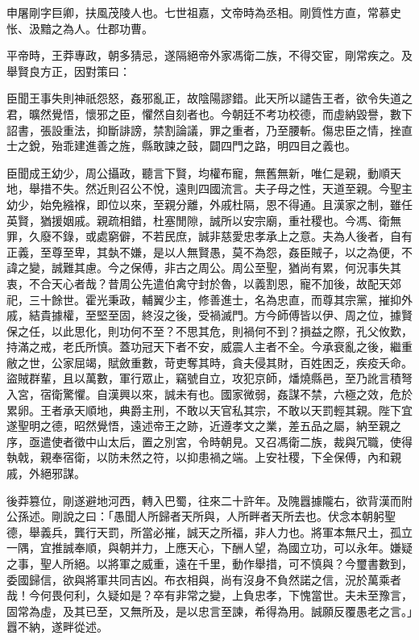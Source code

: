 
\begin{pinyinscope}
申屠剛字巨卿，扶風茂陵人也。七世祖嘉，文帝時為丞相。剛質性方直，常慕史怅、汲黯之為人。仕郡功曹。

平帝時，王莽專政，朝多猜忌，遂隔絕帝外家馮衛二族，不得交宦，剛常疾之。及舉賢良方正，因對策曰：

臣聞王事失則神祇怨怒，姦邪亂正，故陰陽謬錯。此天所以譴告王者，欲令失道之君，曠然覺悟，懷邪之臣，懼然自刻者也。今朝廷不考功校德，而虛納毀譽，數下詔書，張設重法，抑斷誹謗，禁割論議，罪之重者，乃至腰斬。傷忠臣之情，挫直士之銳，殆乖建進善之旌，縣敢諫之鼓，闢四門之路，明四目之義也。

臣聞成王幼少，周公攝政，聽言下賢，均權布寵，無舊無新，唯仁是親，動順天地，舉措不失。然近則召公不悅，遠則四國流言。夫子母之性，天道至親。今聖主幼少，始免繈褓，即位以來，至親分離，外戚杜隔，恩不得通。且漢家之制，雖任英賢，猶援姻戚。親疏相錯，杜塞閒隙，誠所以安宗廟，重社稷也。今馮、衛無罪，久廢不錄，或處窮僻，不若民庶，誠非慈愛忠孝承上之意。夫為人後者，自有正義，至尊至卑，其埶不嫌，是以人無賢愚，莫不為怨，姦臣賊子，以之為便，不諱之變，誠難其慮。今之保傅，非古之周公。周公至聖，猶尚有累，何況事失其衷，不合天心者哉？昔周公先遣伯禽守封於魯，以義割恩，寵不加後，故配天郊祀，三十餘世。霍光秉政，輔翼少主，修善進士，名為忠直，而尊其宗黨，摧抑外戚，結貴據權，至堅至固，終沒之後，受禍滅門。方今師傅皆以伊、周之位，據賢保之任，以此思化，則功何不至？不思其危，則禍何不到？損益之際，孔父攸歎，持滿之戒，老氏所慎。蓋功冠天下者不安，威震人主者不全。今承衰亂之後，繼重敝之世，公家屈竭，賦斂重數，苛吏奪其時，貪夫侵其財，百姓困乏，疾疫夭命。盜賊群輩，且以萬數，軍行眾止，竊號自立，攻犯京師，燔燒縣邑，至乃訛言積弩入宮，宿衛驚懼。自漢興以來，誠未有也。國家微弱，姦謀不禁，六極之效，危於累卵。王者承天順地，典爵主刑，不敢以天官私其宗，不敢以天罰輕其親。陛下宜遂聖明之德，昭然覺悟，遠述帝王之跡，近遵孝文之業，差五品之屬，納至親之序，亟遣使者徵中山太后，置之別宮，令時朝見。又召馮衛二族，裁與冗職，使得執戟，親奉宿衛，以防未然之符，以抑患禍之端。上安社稷，下全保傅，內和親戚，外絕邪謀。

後莽篡位，剛遂避地河西，轉入巴蜀，往來二十許年。及隗囂據隴右，欲背漢而附公孫述。剛說之曰：「愚聞人所歸者天所與，人所畔者天所去也。伏念本朝躬聖德，舉義兵，龔行天罰，所當必摧，誠天之所福，非人力也。將軍本無尺土，孤立一隅，宜推誠奉順，與朝并力，上應天心，下酬人望，為國立功，可以永年。嫌疑之事，聖人所絕。以將軍之威重，遠在千里，動作舉措，可不慎與？今璽書數到，委國歸信，欲與將軍共同吉凶。布衣相與，尚有沒身不負然諾之信，況於萬乘者哉！今何畏何利，久疑如是？卒有非常之變，上負忠孝，下愧當世。夫未至豫言，固常為虛，及其已至，又無所及，是以忠言至諫，希得為用。誠願反覆愚老之言。」囂不納，遂畔從述。


\end{pinyinscope}
